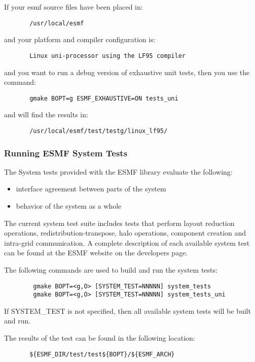 If your esmf source files have been placed in: 
\begin{verbatim}
       /usr/local/esmf
\end{verbatim}

and your platform and compiler configuration is:
\begin{verbatim}
       Linux uni-processor using the LF95 compiler
\end{verbatim}

and you want to run a debug version of exhaustive unit tests,
then you use the command:
\begin{verbatim}
       gmake BOPT=g ESMF_EXHAUSTIVE=ON tests_uni
\end{verbatim}

and will find the results in:
\begin{verbatim}
       /usr/local/esmf/test/testg/linux_lf95/
\end{verbatim}

\subsubsection{Running ESMF System Tests}
\label{SystemTestDescription}

The System tests provided with the ESMF library evaluate the following:
\begin{itemize}
\item interface agreement between parts of the system
\item behavior of the system as a whole
\end{itemize}

The current system test suite includes tests that perform layout reduction operations, redistribution-transpose, halo operations, component creation and intra-grid communication. A complete description of each available system test can be found at the ESMF website on the developers page. 


The following commands are used to build and run the system tests:

\begin{verbatim}
        gmake BOPT=<g,O> [SYSTEM_TEST=NNNNN] system_tests
        gmake BOPT=<g,O> [SYSTEM_TEST=NNNNN] system_tests_uni
\end{verbatim}

If SYSTEM\_TEST is not specified, then all available system tests will be built and run.

The results of the test can be found in the following location:
\begin{verbatim}
       ${ESMF_DIR/test/test${BOPT}/${ESMF_ARCH}
\end{verbatim}

